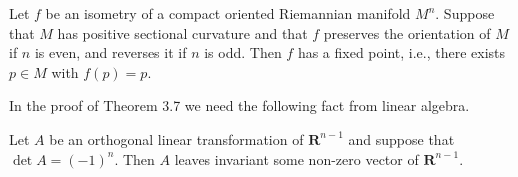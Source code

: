 \begin{theorem}
  \label{thm:dc-ch9-3-7}
  Let $f$ be an isometry of a compact oriented Riemannian manifold $M^n$. Suppose
  that $M$ has positive sectional curvature and that $f$ preserves the orientation of
  $M$ if $n$ is even, and reverses it if $n$ is odd. Then $f$ has a fixed point, i.e.,
  there exists $p\in M$ with $f(p)=p$.
  
  In the proof of Theorem 3.7 we need the following fact from linear algebra.
\end{theorem}

\begin{lemma}
  \label{lem:dc-ch9-3-8}
  Let $A$ be an orthogonal linear transformation of $\mathbf{R}^{n-1}$ and suppose
  that $\det A=(-1)^n$. Then $A$ leaves invariant some non-zero vector of
  $\mathbf{R}^{n-1}$.
\end{lemma}
